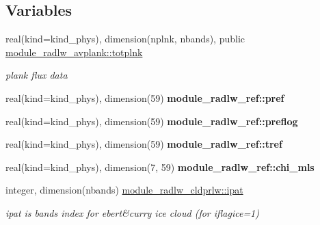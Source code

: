\subsection*{Variables}
\begin{DoxyCompactItemize}
\item 
\mbox{\label{namespacemodule__radlw__avplank_a40c3d6831ec6d7dbdb31254226c8f861}} 
real(kind=kind\+\_\+phys), dimension(nplnk, nbands), public \hyperlink{namespacemodule__radlw__avplank_a40c3d6831ec6d7dbdb31254226c8f861}{module\+\_\+radlw\+\_\+avplank\+::totplnk}
\begin{DoxyCompactList}\small\item\em plank flux data \end{DoxyCompactList}\item 
\mbox{\label{namespacemodule__radlw__ref_adda97d9a274bef59507633a3fc5a0e78}} 
real(kind=kind\+\_\+phys), dimension(59) {\bfseries module\+\_\+radlw\+\_\+ref\+::pref}
\item 
\mbox{\label{namespacemodule__radlw__ref_a4206f7320b6f1b59eb0132326263d2e4}} 
real(kind=kind\+\_\+phys), dimension(59) {\bfseries module\+\_\+radlw\+\_\+ref\+::preflog}
\item 
\mbox{\label{namespacemodule__radlw__ref_a56972f3948052e8b7f4717c192fc551d}} 
real(kind=kind\+\_\+phys), dimension(59) {\bfseries module\+\_\+radlw\+\_\+ref\+::tref}
\item 
\mbox{\label{namespacemodule__radlw__ref_adc2bbd1ac0178afda84e74ad45404d31}} 
real(kind=kind\+\_\+phys), dimension(7, 59) {\bfseries module\+\_\+radlw\+\_\+ref\+::chi\+\_\+mls}
\item 
\mbox{\label{namespacemodule__radlw__cldprlw_a9e8ebd81d5d62c2be4c006a595493aed}} 
integer, dimension(nbands) \hyperlink{namespacemodule__radlw__cldprlw_a9e8ebd81d5d62c2be4c006a595493aed}{module\+\_\+radlw\+\_\+cldprlw\+::ipat}
\begin{DoxyCompactList}\small\item\em ipat is bands index for ebert\&curry ice cloud (for iflagice=1) \end{DoxyCompactList}\item 

\end{DoxyCompactItemize}
